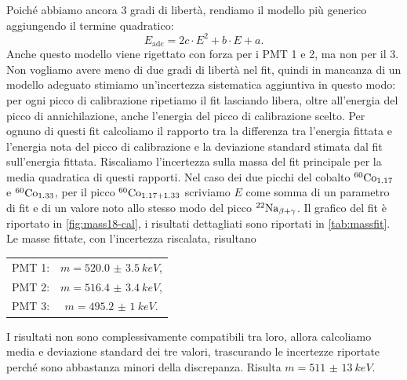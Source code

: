 Poiché abbiamo ancora 3 gradi di libertà,
rendiamo il modello più generico aggiungendo il termine quadratico:
\begin{equation}
	\label{eq:parabola}
	E_\text{adc} = 2c \cdot E^2 + b \cdot E + a.
\end{equation}
Anche questo modello viene rigettato con forza per i PMT 1 e 2, ma non per il 3.
Non vogliamo avere meno di due gradi di libertà nel fit,
quindi in mancanza di un modello adeguato stimiamo un'incertezza sistematica aggiuntiva in questo modo:
per ogni picco di calibrazione ripetiamo il fit lasciando libera,
oltre all'energia del picco di annichilazione,
anche l'energia del picco di calibrazione scelto.
Per ognuno di questi fit calcoliamo il rapporto tra
la differenza tra l'energia fittata e l'energia nota del picco di calibrazione
e la deviazione standard stimata dal fit sull'energia fittata.
Riscaliamo l'incertezza sulla massa del fit principale
per la media quadratica di questi rapporti.
Nel caso dei due picchi del cobalto $^{\text{60}}\text{Co}_{1.17}$ e $^{\text{60}}\text{Co}_{1.33}$,
per il picco $^{\text{60}}\text{Co}_{1.17+1.33}$ scriviamo $E$ come somma di un parametro di fit e di un valore noto
allo stesso modo del picco $^{\text{22}}\text{Na}_{\beta+\gamma}$.
Il grafico del fit è riportato in \autoref{fig:mass18-cal},
i risultati dettagliati sono riportati in \autoref{tab:massfit}.
Le masse fittate, con l'incertezza riscalata, risultano
\begin{center}
	\begin{tabular}{cc}
		PMT 1: & $m=\SI{520.0(35)}{keV}$, \\
		PMT 2: & $m=\SI{516.4(34)}{keV}$, \\
		PMT 3: & $m=\SI{495.2(10)}{keV}$.
	\end{tabular}
\end{center}
I risultati non sono complessivamente compatibili tra loro,
allora calcoliamo media e deviazione standard dei tre valori,
trascurando le incertezze riportate perché sono abbastanza minori della discrepanza.
Risulta $m=\SI{511(13)}{keV}$.

